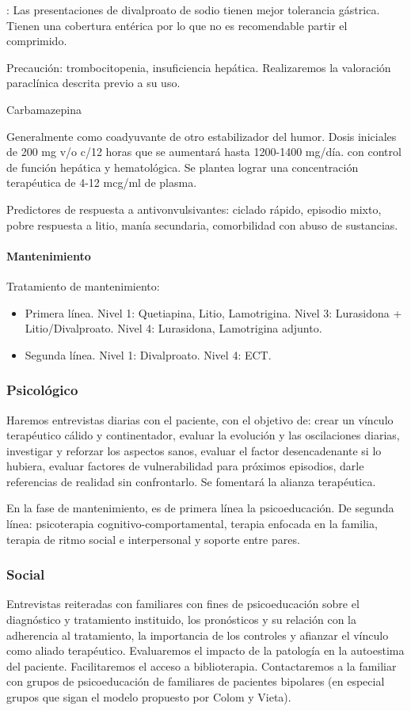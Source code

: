 \faExclamationTriangle : Las presentaciones de divalproato de sodio tienen mejor tolerancia gástrica. Tienen una cobertura entérica por lo que no es recomendable partir el comprimido.

Precaución: trombocitopenia, insuficiencia hepática. Realizaremos la valoración paraclínica descrita previo a su uso.

\faPills Carbamazepina

Generalmente como coadyuvante de otro estabilizador del humor. Dosis iniciales de 200 mg v/o c/12 horas que se aumentará hasta 1200-1400 mg/día. con control de función hepática y hematológica. Se plantea lograr una concentración terapéutica de 4-12 mcg/ml de plasma.

\faLightbulb Predictores de respuesta a antivonvulsivantes: ciclado rápido, episodio mixto, pobre respuesta a litio, manía secundaria, comorbilidad con abuso de sustancias.
\paragraph{Mantenimiento}
Tratamiento de mantenimiento:
\begin{itemize}
	\item Primera línea. Nivel 1: Quetiapina, Litio, Lamotrigina. Nivel 3: Lurasidona + Litio/Divalproato. Nivel 4: Lurasidona, Lamotrigina adjunto.
	\item Segunda línea. Nivel 1: Divalproato. Nivel 4: ECT.
\end{itemize}
\subsubsection*{Psicológico}
Haremos entrevistas diarias con el paciente, con el objetivo de: crear un vínculo terapéutico cálido y continentador, evaluar la evolución y las oscilaciones diarias, investigar y reforzar los aspectos sanos, evaluar el factor desencadenante si lo hubiera, evaluar factores de vulnerabilidad para próximos episodios, darle referencias de realidad sin confrontarlo. Se fomentará la alianza terapéutica.

En la fase de mantenimiento, es de primera línea la psicoeducación. De segunda línea: psicoterapia cognitivo-comportamental, terapia enfocada en la familia, terapia de ritmo social e interpersonal y soporte entre pares\cite{yatham2018canadian}.

\subsubsection*{Social}
Entrevistas reiteradas con familiares con fines de psicoeducación sobre el diagnóstico y tratamiento instituido, los pronósticos y su relación con la adherencia al tratamiento, la importancia de los controles y afianzar el vínculo como aliado terapéutico. Evaluaremos el impacto de la patología en la autoestima del paciente. Facilitaremos el acceso a biblioterapia. Contactaremos a la familiar con grupos de psicoeducación de familiares de pacientes bipolares (en especial grupos que sigan el modelo propuesto por Colom y Vieta).

